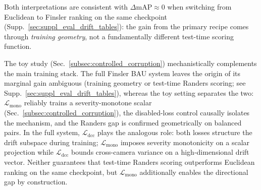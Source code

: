 Both interpretations are consistent with $\Delta\mathrm{mAP}{\approx}0$ when switching from Euclidean to Finsler ranking on the same checkpoint (Supp.~\ref{sec:suppl_eval_drift_tables}): the gain from the primary recipe comes through \emph{training geometry}, not a fundamentally different test-time scoring function.

The toy study (Sec.~\ref{subsec:controlled_corruption}) mechanistically complements the main training stack. The full Finsler BAU system leaves the origin of its marginal gain ambiguous (training geometry or test-time Randers scoring; see Supp.~\ref{sec:suppl_eval_drift_tables}), whereas the toy setting separates the two: $\mathcal{L}_{\mathrm{mono}}$ reliably trains a severity-monotone scalar (Sec.~\ref{subsec:controlled_corruption}), the disabled-loss control causally isolates the mechanism, and the Randers gap is confirmed geometrically on balanced pairs. In the full system, $\mathcal{L}_{\mathrm{dcc}}$ plays the analogous role: both losses structure the drift subspace during training; $\mathcal{L}_{\mathrm{mono}}$ imposes severity monotonicity on a scalar projection while $\mathcal{L}_{\mathrm{dcc}}$ bounds cross-camera variance on a high-dimensional drift vector. Neither guarantees that test-time Randers scoring outperforms Euclidean ranking on the same checkpoint, but $\mathcal{L}_{\mathrm{mono}}$ additionally enables the directional gap by construction.
